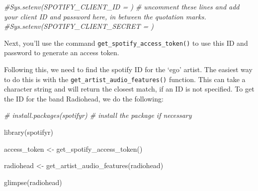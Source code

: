 \documentclass[
]{book}
\newenvironment{Shaded}{\begin{snugshade}}{\end{snugshade}}
\newcommand{\CommentTok}[1]{\textcolor[rgb]{0.56,0.35,0.01}{\textit{#1}}}
\newcommand{\FunctionTok}[1]{\textcolor[rgb]{0.00,0.00,0.00}{#1}}
\newcommand{\NormalTok}[1]{#1}
\newcommand{\OtherTok}[1]{\textcolor[rgb]{0.56,0.35,0.01}{#1}}
\newcommand{\StringTok}[1]{\textcolor[rgb]{0.31,0.60,0.02}{#1}}
\begin{document}
\begin{Shaded}
\begin{Highlighting}[]
 \CommentTok{\#Sys.setenv(SPOTIFY\_CLIENT\_ID = \textquotesingle{}\textquotesingle{}) \# uncomment these lines and add your client ID and password here, in between the quotation marks. }
 \CommentTok{\#Sys.setenv(SPOTIFY\_CLIENT\_SECRET = \textquotesingle{}\textquotesingle{})}
\end{Highlighting}
\end{Shaded}

Next, you'll use the command \texttt{get\_spotify\_access\_token()} to use this ID and password to generate an access token.

Following this, we need to find the spotify ID for the `ego' artist. The easiest way to do this is with the \texttt{get\_artist\_audio\_features()} function. This can take a character string and will return the closest match, if an ID is not specified. To get the ID for the band Radiohead, we do the following:

\begin{Shaded}
\begin{Highlighting}[]
\CommentTok{\# install.packages(\textquotesingle{}spotifyr\textquotesingle{}) \# install the package if necessary}

\FunctionTok{library}\NormalTok{(spotifyr)}


\NormalTok{access\_token }\OtherTok{\textless{}{-}} \FunctionTok{get\_spotify\_access\_token}\NormalTok{()}


\NormalTok{radiohead }\OtherTok{\textless{}{-}} \FunctionTok{get\_artist\_audio\_features}\NormalTok{(}\StringTok{\textquotesingle{}radiohead\textquotesingle{}}\NormalTok{)}

\FunctionTok{glimpse}\NormalTok{(radiohead)}
\end{Highlighting}
\end{Shaded}
\end{document}
